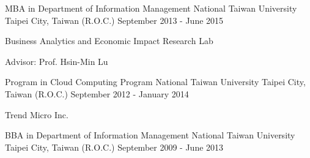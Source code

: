 

\begin{cventries}

  \cventry
    {MBA in Department of Information Management} %
    {National Taiwan University} %
    {Taipei City, Taiwan (R.O.C.)} %
    {September 2013 - June 2015} %
    {
      \begin{cvitems} %
        \item {Business Analytics and Economic Impact Research Lab}
        \item {Advisor: Prof. Hsin-Min Lu}
      \end{cvitems}
    }

  \cventry
    {Program in Cloud Computing Program} %
    {National Taiwan University} %
    {Taipei City, Taiwan (R.O.C.)} %
    {September 2012 - January 2014} %
    {
      \begin{cvitems} %
        \item {Trend Micro Inc.}
      \end{cvitems}
    }

  \cventry
    {BBA in Department of Information Management} %
    {National Taiwan University} %
    {Taipei City, Taiwan (R.O.C.)} %
    {September 2009 - June 2013} %
    {
      \begin{cvitems} %
      \end{cvitems}
    }
\end{cventries}
